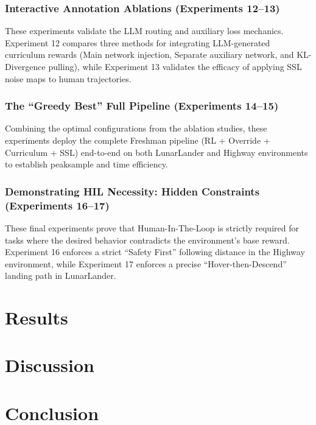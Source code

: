\documentclass{article}
\begin{document}
\subsubsection{Interactive Annotation Ablations (Experiments 12--13)}
These experiments validate the LLM routing and auxiliary loss mechanics. Experiment 12 compares three methods for integrating LLM-generated curriculum rewards (Main network injection, Separate auxiliary network, and KL-Divergence pulling), while Experiment 13 validates the efficacy of applying SSL noise maps to human trajectories.

\subsubsection{The ``Greedy Best'' Full Pipeline (Experiments 14--15)}
Combining the optimal configurations from the ablation studies, these experiments deploy the complete Freshman pipeline (RL + Override + Curriculum + SSL) end-to-end on both LunarLander and Highway environments to establish peaksample and time efficiency.
\subsubsection{Demonstrating HIL Necessity: Hidden Constraints (Experiments 16--17)}
These final experiments prove that Human-In-The-Loop is strictly required for tasks where the desired behavior contradicts the environment's base reward. Experiment 16 enforces a strict ``Safety First'' following distance in the Highway environment, while Experiment 17 enforces a precise ``Hover-then-Descend'' landing path in LunarLander.

\section{Results}
\lipsum[3-5] %

\section{Discussion}
\lipsum[6-7] %

\section{Conclusion}
\lipsum[8] %
\end{document}
